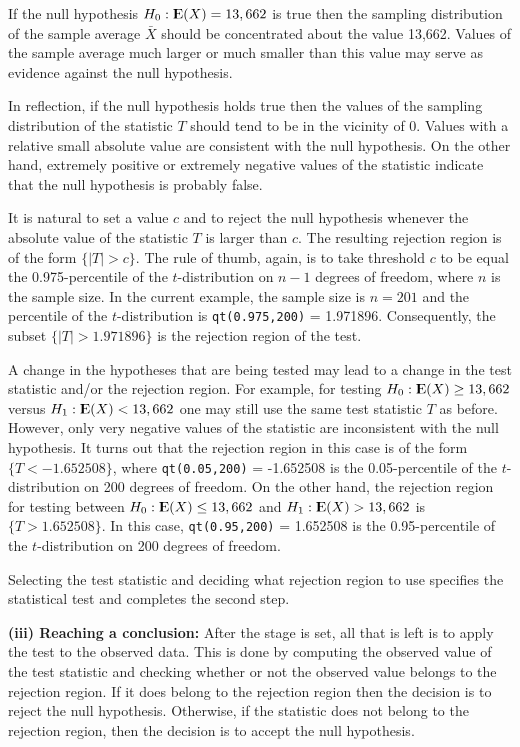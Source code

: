 \documentclass[]{krantz}
\newcommand{\Expec}{{\rm I\kern-.3em E}}
\theoremstyle{definition}
\theoremstyle{definition}
\theoremstyle{definition}
\theoremstyle{remark}
\begin{document}
If the null hypothesis \(H_0:\Expec(X) = 13,662\) is true then the
sampling distribution of the sample average \(\bar X\) should be
concentrated about the value 13,662. Values of the sample average much
larger or much smaller than this value may serve as evidence against the
null hypothesis.

In reflection, if the null hypothesis holds true then the values of the
sampling distribution of the statistic \(T\) should tend to be in the
vicinity of 0. Values with a relative small absolute value are
consistent with the null hypothesis. On the other hand, extremely
positive or extremely negative values of the statistic indicate that the
null hypothesis is probably false.

It is natural to set a value \(c\) and to reject the null hypothesis
whenever the absolute value of the statistic \(T\) is larger than \(c\).
The resulting rejection region is of the form \(\{|T| > c\}\). The rule
of thumb, again, is to take threshold \(c\) to be equal the
0.975-percentile of the \(t\)-distribution on \(n-1\) degrees of
freedom, where \(n\) is the sample size. In the current example, the
sample size is \(n=201\) and the percentile of the \(t\)-distribution is
\texttt{qt(0.975,200)} = 1.971896. Consequently, the subset
\(\{|T| > 1.971896\}\) is the rejection region of the test.

A change in the hypotheses that are being tested may lead to a change in
the test statistic and/or the rejection region. For example, for testing
\(H_0: \Expec(X) \geq 13,662\) versus \(H_1: \Expec(X) < 13,662\) one
may still use the same test statistic \(T\) as before. However, only
very negative values of the statistic are inconsistent with the null
hypothesis. It turns out that the rejection region in this case is of
the form \(\{T < -1.652508\}\), where \texttt{qt(0.05,200)} = -1.652508
is the 0.05-percentile of the \(t\)-distribution on 200 degrees of
freedom. On the other hand, the rejection region for testing between
\(H_0: \Expec(X) \leq 13,662\) and \(H_1: \Expec(X) > 13,662\) is
\(\{T > 1.652508\}\). In this case, \texttt{qt(0.95,200)} = 1.652508 is
the 0.95-percentile of the \(t\)-distribution on 200 degrees of freedom.

Selecting the test statistic and deciding what rejection region to use
specifies the statistical test and completes the second step.

{\textbf{(iii) Reaching a conclusion:}} After the stage is set, all that
is left is to apply the test to the observed data. This is done by
computing the observed value of the test statistic and checking whether
or not the observed value belongs to the rejection region. If it does
belong to the rejection region then the decision is to reject the null
hypothesis. Otherwise, if the statistic does not belong to the rejection
region, then the decision is to accept the null hypothesis.
\end{document}
